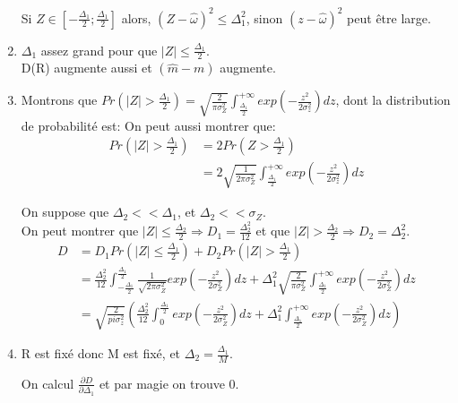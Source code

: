 \documentclass{../../td}
\begin{document}
\begin{enumerate}
Si $Z \in [-\frac{\Delta_1}{2}; \frac{\Delta_1}{2}]$ alors, $ (Z-\hat{\omega})^2 \leq \Delta_1^2$, sinon $(z-\hat{\omega})^2$ peut être large.

\item $\Delta_1$ assez grand pour que $|Z| \leq \frac{\Delta_1}{2}$.\\
D(R) augmente aussi et $(\hat{m}-m)$ augmente.

\item Montrons que $Pr(|Z|> \frac{\Delta_1}{2}) = \sqrt{\frac{2}{\pi \sigma_Z^2}} \int_{\frac{\Delta_1}{2}}^{+\infty} exp(-\frac{z^2}{2\sigma_z^2}) dz$, dont la distribution de probabilité est:
On peut aussi montrer que:
\begin{align*}
Pr(|Z|>\frac{\Delta_1}{2}) &= 2 Pr(Z > \frac{\Delta_1}{2})\\
&= 2 \sqrt{\frac{1}{2\pi \sigma_Z^2}} \int_{\frac{\Delta_1}{2}}^{+\infty} exp(-\frac{z^2}{2\sigma_z^2}) dz
\end{align*}

On suppose que $ \Delta_2 << \Delta_1$, et $\Delta_2 << \sigma_Z$.\\
On peut montrer que $|Z| \leq \frac{\Delta_2}{2} \Rightarrow D_1 = \frac{\Delta_2^2}{12}$ et que $|Z| > \frac{\Delta_2}{2} \Rightarrow D_2 = \Delta_2^2$.\\

\begin{align*}
D &= D_1 Pr(|Z| \leq \frac{\Delta_1}{2}) + D_2 Pr(|Z| > \frac{\Delta_1}{2})\\
&= \frac{\Delta_2^2}{12} \int_{-\frac{\Delta_1}{2}}^{\frac{\Delta_1}{2}} \frac{1}{\sqrt{2\pi \sigma_Z^2}} exp(-\frac{z^2}{2\sigma_Z^2})dz + \Delta_1^2 \sqrt{\frac{2}{\pi \sigma_Z^2}} \int_{\frac{\Delta_1}{2}}^{+\infty} exp(-\frac{z^2}{2\sigma_Z^2})dz\\
&= \sqrt{\frac{2}{pi \sigma_z^2}} \left(\frac{\Delta_2^2}{12} \int_{0}^{\frac{\Delta_1}{2}} exp(-\frac{z^2}{2\sigma_Z^2})dz + \Delta_1^2 \int_{\frac{\Delta_1}{2}}^{+\infty} exp(-\frac{z^2}{2\sigma_Z^2})dz\right)
\end{align*}

\item R est fixé donc M est fixé, et $\Delta_2 = \frac{\Delta_1}{M}$.

On calcul $\frac{\partial D}{\partial \Delta_1}$ et par magie on trouve 0.

\end{enumerate}
\end{document}
